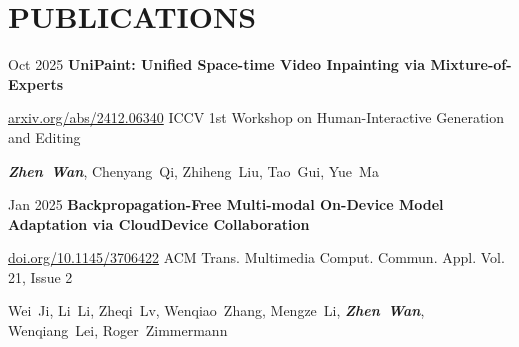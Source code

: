 \section{PUBLICATIONS}

\vspace{0.10 cm}
\begin{twocolentry}{
    Oct 2025
}
    {\ResumeEntryTitleFont\textbf{UniPaint: Unified Space-time Video Inpainting via Mixture-of-Experts}}
\end{twocolentry}
\vspace{0.10 cm}
\begin{twocolentry}
{\href{https://arxiv.org/abs/2412.06340}{arxiv.org/abs/2412.06340}}
{\ResumeEntryMetaFont ICCV 1st Workshop on Human-Interactive Generation and Editing}
\end{twocolentry}
\vspace{0.10 cm}
\begin{onecolentry}
    \mbox{\textbf{\textit{Zhen Wan}}}, \mbox{Chenyang Qi}, \mbox{Zhiheng Liu}, \mbox{Tao Gui}, \mbox{Yue Ma}
\end{onecolentry}

\vspace{0.20 cm}
\begin{twocolentry}{
    Jan 2025
}
    {\ResumeEntryTitleFont\textbf{Backpropagation-Free Multi-modal On-Device Model Adaptation via CloudDevice Collaboration}}
\end{twocolentry}
\vspace{0.10 cm}
\begin{twocolentry}
{\href{https://doi.org/10.1145/3706422}{doi.org/10.1145/3706422}}
{\ResumeEntryMetaFont ACM Trans. Multimedia Comput. Commun. Appl. Vol. 21, Issue 2}
\end{twocolentry}
\vspace{0.10 cm}
\begin{onecolentry}
    \mbox{Wei Ji}, \mbox{Li Li}, \mbox{Zheqi Lv}, \mbox{Wenqiao Zhang}, \mbox{Mengze Li}, \mbox{\textbf{\textit{Zhen Wan}}}, \mbox{Wenqiang Lei}, \mbox{Roger Zimmermann}
\end{onecolentry}
